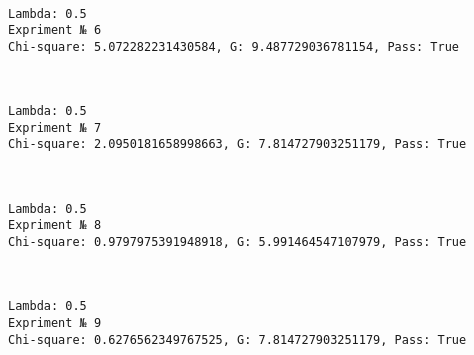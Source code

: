 \documentclass[11pt]{article}
\begin{document}
    \begin{center}
    \end{center}
    { \hspace*{\fill} \\}
    
    \begin{Verbatim}[commandchars=\\\{\}]
Lambda: 0.5
Expriment № 6
Chi-square: 5.072282231430584, G: 9.487729036781154, Pass: True
    \end{Verbatim}

    \begin{center}
    \end{center}
    { \hspace*{\fill} \\}
    
    \begin{Verbatim}[commandchars=\\\{\}]
Lambda: 0.5
Expriment № 7
Chi-square: 2.0950181658998663, G: 7.814727903251179, Pass: True
    \end{Verbatim}

    \begin{center}
    \end{center}
    { \hspace*{\fill} \\}
    
    \begin{Verbatim}[commandchars=\\\{\}]
Lambda: 0.5
Expriment № 8
Chi-square: 0.9797975391948918, G: 5.991464547107979, Pass: True
    \end{Verbatim}

    \begin{center}
    \end{center}
    { \hspace*{\fill} \\}
    
    \begin{Verbatim}[commandchars=\\\{\}]
Lambda: 0.5
Expriment № 9
Chi-square: 0.6276562349767525, G: 7.814727903251179, Pass: True
    \end{Verbatim}
\end{document}
